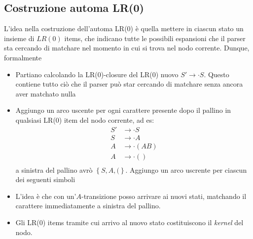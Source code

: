 \subsection{Costruzione automa LR(0)} \label{costruzione automa lr0}
L'idea nella costruzione dell'automa LR(0) è quella mettere in ciascun stato un insieme di $ LR\left(0\right) $ items, che indicano tutte le possibili espansioni che il parser sta cercando di matchare nel momento in cui si trova nel nodo corrente. Dunque, formalmente
\begin{itemize}
	\item Partiano calcolando la LR(0)-closure del LR(0) nuovo $ S' \rightarrow \cdot S $. Questo contiene tutto ciò che il parser può star cercando di matchare senza ancora aver matchato nulla
	\item Aggiungo un arco uscente per ogni carattere presente dopo il pallino in qualsiasi LR(0) item del nodo corrente, ad es:
	      \begin{align*}
		      S' & \rightarrow \cdot S               \\
		      S  & \rightarrow \cdot A               \\
		      A  & \rightarrow \cdot \left(AB\right) \\
		      A  & \rightarrow \cdot \left(\right)   \\
	      \end{align*}
	      a sinistra del pallino avrò $ \left\{S,A,(\right\} $. Aggiungo un arco uscrente per ciascun dei seguenti simboli
	\item L'idea è che con un'$ A $-transizione posso arrivare ai nuovi stati, matchando il carattere immediatamente a sinistra del pallino.
	\item Gli LR(0) items tramite cui arrivo al nuovo stato costituiscono il \textit{kernel} del nodo.
	      \begin{center}
\end{center}
\end{itemize}
